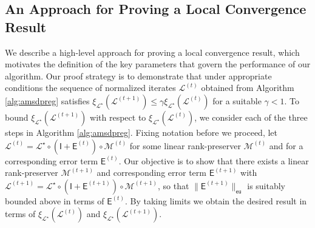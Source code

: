 \documentclass[11pt,letterpaper]{article}
\renewcommand{\L}{\mathcal{L}}
\newcommand{\botimes}{\boldsymbol \otimes}
\newcommand{\ca}{\mathcal{A}}
\newcommand{\sfe}{\mathsf{E}}
\newcommand{\sfi}{\mathsf{I}}
\newcommand{\eu}{\mathsf{eu}}
\begin{document}

\subsection{An Approach for Proving a Local Convergence Result} \label{sec:analysis_proofhighlevel}

We describe a high-level approach for proving a local convergence result, which motivates the definition of the key parameters that govern the performance of our algorithm.  Our proof strategy is to demonstrate that under appropriate conditions the sequence of normalized iterates $\L^{(t)}$ obtained from Algorithm \ref{alg:amsdpreg} satisfies $\xi_{\L^\star}(\L^{(t+1)}) \leq \gamma \xi_{\L^\star}(\L^{(t)})$ for a suitable $\gamma < 1$.  To bound $\xi_{\L^\star}(\L^{(t+1)})$ with respect to $\xi_{\L^\star}(\L^{(t)})$, we consider each of the three steps in Algorithm \ref{alg:amsdpreg}.  Fixing notation before we proceed, let $\L^{(t)} = {\L^{\star}} \circ (\sfi + \sfe^{(t)}) \circ \mathcal{M}^{(t)}$ for some linear rank-preserver $\mathcal{M}^{(t)}$ and for a corresponding error term $\sfe^{(t)}$.  Our objective is to show that there exists a linear rank-preserver $\mathcal{M}^{(t+1)}$ and corresponding error term $\sfe^{(t+1)}$ with $\L^{(t+1)} = {\L^{\star}} \circ (\sfi + \sfe^{(t+1)}) \circ \mathcal{M}^{(t+1)}$, so that $\|\sfe^{(t+1)}\|_\eu$ is suitably bounded above in terms of $\sfe^{(t)}$.  By taking limits we obtain the desired result in terms of $\xi_{\L^\star}(\L^{(t)})$ and $\xi_{\L^\star}(\L^{(t+1)})$.
\end{document}
